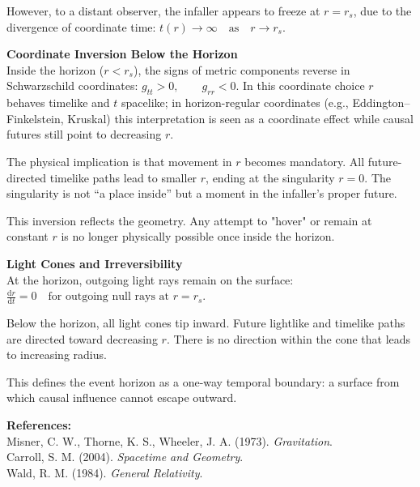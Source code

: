 \begin{technical}
However, to a distant observer, the infaller appears to freeze at \(r = r_s\), due to the divergence of coordinate time: $
t(r) \to \infty \quad \text{as} \quad r \to r_s$.

\vspace{0.3em}
\noindent\textbf{Coordinate Inversion Below the Horizon}\\[0.5em]
Inside the horizon (\(r < r_s\)), the signs of metric components reverse in Schwarzschild coordinates: $g_{tt} > 0, \qquad g_{rr} < 0$.
In this coordinate choice \(r\) behaves timelike and \(t\) spacelike; in horizon-regular coordinates (e.g., Eddington–Finkelstein, Kruskal) this interpretation is seen as a coordinate effect while causal futures still point to decreasing \(r\).

The physical implication is that movement in \(r\) becomes mandatory. All future-directed timelike paths lead to smaller \(r\), ending at the singularity \(r = 0\). The singularity is not “a place inside” but a moment in the infaller’s proper future.

This inversion  reflects the geometry. Any attempt to "hover" or remain at constant \(r\) is no longer physically possible once inside the horizon.

\vspace{0.3em}
\noindent\textbf{Light Cones and Irreversibility}\\[0.5em]
At the horizon, outgoing light rays remain on the surface: $\frac{\mathrm{d}r}{\mathrm{d}t} = 0 \quad \text{for outgoing null rays at } r = r_s$.

Below the horizon, all light cones tip inward. Future lightlike and timelike paths are directed toward decreasing \(r\). There is no direction within the cone that leads to increasing radius.

This defines the event horizon as a one-way temporal boundary: a surface from which causal influence cannot escape outward.

\vspace{0.7em}
\noindent\textbf{References:}\\
{\footnotesize
Misner, C. W., Thorne, K. S., Wheeler, J. A. (1973). \textit{Gravitation}.\\
Carroll, S. M. (2004). \textit{Spacetime and Geometry}.\\
Wald, R. M. (1984). \textit{General Relativity}.
}
\end{technical}
